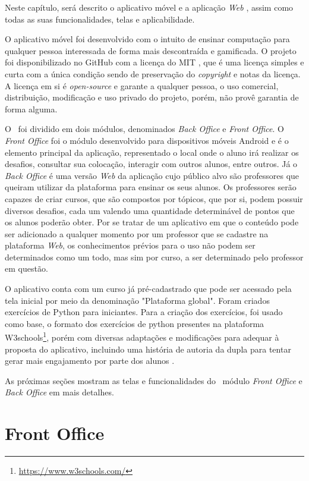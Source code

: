 Neste capítulo, será descrito o aplicativo móvel e a aplicação \textit{Web} \appName, assim como todas as suas funcionalidades, telas e aplicabilidade.

O aplicativo móvel foi desenvolvido com o intuito de ensinar computação para qualquer pessoa interessada de forma mais descontraída e gamificada. O projeto foi disponibilizado no GitHub com a licença do MIT \cite{mit-license}, que é uma licença simples e curta com a única condição sendo de preservação do \textit{copyright} e notas da licença. A licença em si é \textit{open-source} e garante a qualquer pessoa, o uso comercial, distribuição, modificação e uso privado do projeto, porém, não provê garantia de forma alguma.

O \appName\ foi dividido em dois módulos, denominados \textit{Back Office} e \textit{Front Office}. O \textit{Front Office} foi o módulo desenvolvido para dispositivos móveis Android e é o elemento principal da aplicação, representado o local onde o aluno irá realizar os desafios, consultar sua colocação, interagir com outros alunos, entre outros. Já o \textit{Back Office} é uma versão \textit{Web} da aplicação cujo público alvo são professores que queiram utilizar da plataforma para ensinar os seus alunos. Os professores serão capazes de criar cursos, que são compostos por tópicos, que por si, podem possuir diversos desafios, cada um valendo uma quantidade determinável de pontos que os alunos poderão obter. Por se tratar de um aplicativo em que o conteúdo pode ser adicionado a qualquer momento por um professor que se cadastre na plataforma \textit{Web}, os conhecimentos prévios para o uso não podem ser determinados como um todo, mas sim por curso, a ser determinado pelo professor em questão.

O aplicativo conta com um curso já pré-cadastrado que pode ser acessado pela tela inicial por meio da denominação "Plataforma global". Foram criados exercícios de Python para iniciantes. Para a criação dos exercícios, foi usado como base, o formato dos exercícios de python presentes na plataforma W3schools\footnote{\url{https://www.w3schools.com/}}, porém com diversas adaptações e modificações para adequar à proposta do aplicativo, incluindo uma história de autoria da dupla para tentar gerar mais engajamento por parte dos alunos \cite{gamification_motivates}.

As próximas seções mostram as telas e funcionalidades do \appName\, módulo \textit{Front Office} e \textit{Back Office} em mais detalhes.

\section{Front Office}

